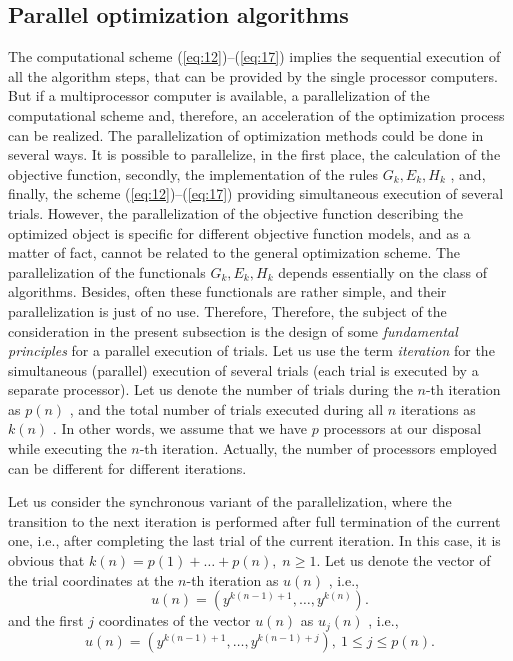 \subsection {Parallel optimization algorithms}
\label {subsec:1.2.2}
The computational scheme (\ref{eq:12})--(\ref{eq:17}) implies  the sequential execution of all the algorithm steps, that can be provided by the single processor computers. But if a multiprocessor computer is available, a parallelization of the computational scheme and, therefore, an acceleration of the optimization process can be realized. The parallelization of optimization methods could be done in several ways. It is possible to parallelize, in the first place, the calculation of the objective function, secondly, the implementation of the rules $G_k,E_k,H_k$ , and, finally, the scheme (\ref{eq:12})--(\ref{eq:17}) providing simultaneous execution of several trials. However, the parallelization of the objective function describing the optimized object is specific for different objective function models, and as a matter of fact, cannot be related to the general optimization scheme. The parallelization of the functionals  $G_k,E_k,H_k$ depends essentially on the class of algorithms. Besides, often these functionals are rather simple, and their parallelization is just of no use. Therefore, Therefore, the subject of the consideration in the present subsection  is the design of some \textit {fundamental principles} for a parallel execution of trials.  Let us use the term \textit {iteration} for the simultaneous (parallel) execution of several trials (each trial is executed by a separate processor). Let us denote the number of trials during the $n$-th iteration as $p(n)$ , and the total number of trials executed during all $n$ iterations as $k(n)$ . In other words, we assume that we have  $p$  processors at our disposal while executing the $n$-th iteration. Actually, the number of processors employed can be different for different iterations. 

Let us consider the synchronous variant of the parallelization, where the transition to the next iteration is performed after full termination of the current one, i.e., after completing the last trial of the current iteration. In this case, it is obvious that $k(n)=p(1)+\ldots + p(n), \; n\geq 1$.  Let us denote the vector of the trial coordinates at the $n$-th iteration as $u(n)$ , i.e.,
\begin{displaymath}
u(n)=(y^{k(n-1)+1},\ldots ,y^{k(n)}) .
\end{displaymath}
and the first $j$ coordinates of the vector $u(n)$  as $u_j(n)$ , i.e., 
\begin{displaymath}
u(n)=(y^{k(n-1)+1},\ldots ,y^{k(n-1)+j}),\ 1\leq j\leq p(n) .
\end{displaymath}

